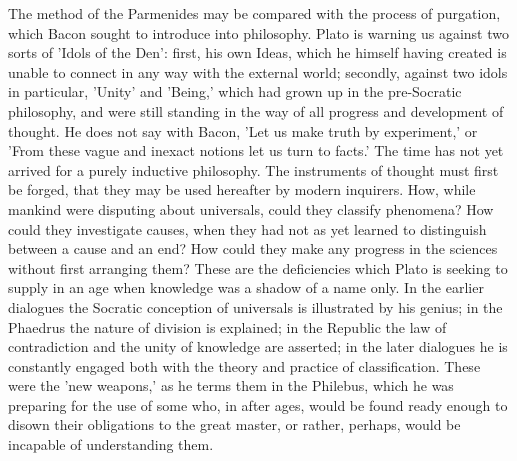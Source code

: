 \documentclass[11pt,letter]{article}
\begin{document}
\par  The method of the Parmenides may be compared with the process of purgation, which Bacon sought to introduce into philosophy. Plato is warning us against two sorts of 'Idols of the Den': first, his own Ideas, which he himself having created is unable to connect in any way with the external world; secondly, against two idols in particular, 'Unity' and 'Being,' which had grown up in the pre-Socratic philosophy, and were still standing in the way of all progress and development of thought. He does not say with Bacon, 'Let us make truth by experiment,' or 'From these vague and inexact notions let us turn to facts.' The time has not yet arrived for a purely inductive philosophy. The instruments of thought must first be forged, that they may be used hereafter by modern inquirers. How, while mankind were disputing about universals, could they classify phenomena? How could they investigate causes, when they had not as yet learned to distinguish between a cause and an end? How could they make any progress in the sciences without first arranging them? These are the deficiencies which Plato is seeking to supply in an age when knowledge was a shadow of a name only. In the earlier dialogues the Socratic conception of universals is illustrated by his genius; in the Phaedrus the nature of division is explained; in the Republic the law of contradiction and the unity of knowledge are asserted; in the later dialogues he is constantly engaged both with the theory and practice of classification. These were the 'new weapons,' as he terms them in the Philebus, which he was preparing for the use of some who, in after ages, would be found ready enough to disown their obligations to the great master, or rather, perhaps, would be incapable of understanding them.
\end{document}
